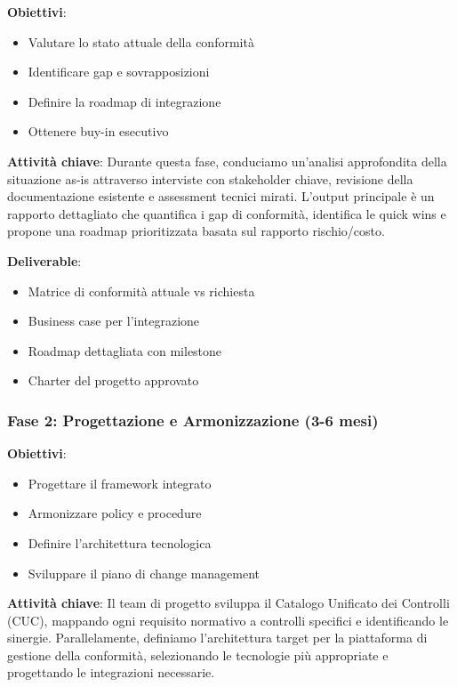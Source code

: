 \textbf{Obiettivi}:
\begin{itemize}
    \item Valutare lo stato attuale della conformità
    \item Identificare gap e sovrapposizioni
    \item Definire la roadmap di integrazione
    \item Ottenere buy-in esecutivo
\end{itemize}

\textbf{Attività chiave}:
Durante questa fase, conduciamo un'analisi approfondita della situazione as-is attraverso interviste con stakeholder chiave, revisione della documentazione esistente e assessment tecnici mirati. L'output principale è un rapporto dettagliato che quantifica i gap di conformità, identifica le quick wins e propone una roadmap prioritizzata basata sul rapporto rischio/costo.

\textbf{Deliverable}:
\begin{itemize}
    \item Matrice di conformità attuale vs richiesta
    \item Business case per l'integrazione
    \item Roadmap dettagliata con milestone
    \item Charter del progetto approvato
\end{itemize}

\subsubsection{\texorpdfstring{Fase 2: Progettazione e Armonizzazione (3-6 mesi)}{4.6.2.2 - Fase 2: Progettazione e Armonizzazione (3-6 mesi)}}

\textbf{Obiettivi}:
\begin{itemize}
    \item Progettare il framework integrato
    \item Armonizzare policy e procedure
    \item Definire l'architettura tecnologica
    \item Sviluppare il piano di change management
\end{itemize}

\textbf{Attività chiave}:
Il team di progetto sviluppa il Catalogo Unificato dei Controlli (CUC), mappando ogni requisito normativo a controlli specifici e identificando le sinergie. Parallelamente, definiamo l'architettura target per la piattaforma di gestione della conformità, selezionando le tecnologie più appropriate e progettando le integrazioni necessarie.

